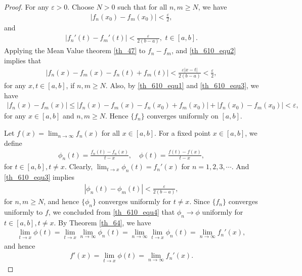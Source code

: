\documentclass[11pt]{book}
\theoremstyle{definition}
\numberwithin{equation}{chapter}
\begin{document}
\begin{proof}
For any $\varepsilon > 0$. Choose $N > 0$ such that for all $n,m \geq N$, we have
\begin{align}\label{th_610_equ1}
    \left|f_n(x_0) - f_m(x_0)\right| < \frac{\varepsilon}{2},
\end{align}
and
\begin{align}\label{th_610_equ2}
    \left|f_n'(t) - f_m'(t)\right| < \frac{\varepsilon}{2(b - a)}, \,\, t \in [a,b].
\end{align}
Applying the Mean Value theorem \ref{th_47} to $f_n - f_m$, and \eqref{th_610_equ2} implies that 
\begin{align}\label{th_610_equ3}
    \left|f_n(x) - f_m(x) - f_n(t) + f_m(t)\right| < \frac{\varepsilon \left|x - t\right|}{2(b - a)} < \frac{\varepsilon}{2},
\end{align}
for any $x,t \in [a,b]$, if $n,m \geq N$. Also, by \eqref{th_610_equ1} and \eqref{th_610_equ3}, we have
\begin{align*}
    \left|f_n(x) - f_m(x)\right| \leq \left|f_n(x) - f_m(x) - f_n(x_0) + f_m(x_0)\right| + \left|f_n(x_0) - f_m(x_0)\right| < \varepsilon,
\end{align*}
for any $x \in [a,b]$ and $n,m \geq N$. Hence $\{f_n\}$ converges uniformly on $[a,b]$.

Let $f(x) = \lim_{n\to\infty} f_n(x)$ for all $x \in [a,b]$. For a fixed point $x \in [a,b]$, we define
\begin{align}\label{th_610_equ4}
    \phi_n(t) = \frac{f_n(t) - f_n(x)}{t - x}, \quad \phi(t) = \frac{f(t) - f(x)}{t - x},
\end{align}
for $t \in [a,b], t \neq x$. Clearly, $\lim_{t\to x} \phi_n(t) = f_n'(x)$ for $n = 1,2,3,\cdots$. And \eqref{th_610_equ3} implies
\begin{align}
    \left|\phi_n(t) - \phi_m(t)\right| < \frac{\varepsilon}{2(b - a)},
\end{align}
for $n,m \geq N$, and hence $\{\phi_n\}$ converges uniformly for $t \neq x$. Since $\{f_n\}$ converges uniformly to $f$, we concluded from \eqref{th_610_equ4} that $\phi_n \to \phi$ uniformly for $t \in [a,b], t \neq x$. By Theorem \ref{th_64}, we have
\begin{align*}
    \lim_{t\to x} \phi(t) = \lim_{t\to x} \lim_{n\to\infty} \phi_n(t) = \lim_{n\to\infty} \lim_{t\to x} \phi_n(t) = \lim_{n\to\infty} f_n'(x),
\end{align*}
and hence
\begin{align*}
    f'(x) = \lim_{t\to x} \phi(t) = \lim_{n\to\infty} f_n'(x).
\end{align*}
\end{proof}
\end{document}
